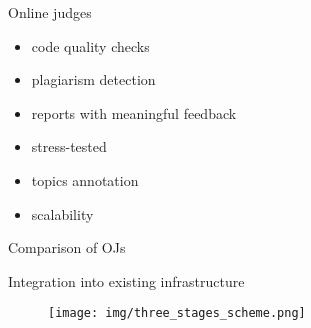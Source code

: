 \documentclass{beamer}%
\begin{document}
\begin{frame}{Online judges}
\begin{changemargin}
\footnotesize




\begin{itemize}
\item<1-> code quality checks
\item<1-> plagiarism detection
\item<1-> reports with meaningful feedback
\item<1-> stress-tested
\item<1-> topics annotation
\item<1-> scalability
\end{itemize}




\end{changemargin}
\end{frame}
\begin{frame}{Comparison of OJs}
\begin{changemargin}
\footnotesize



\end{changemargin}
\end{frame}
\begin{frame}{Integration into existing infrastructure}
\footnotesize


\begin{figure}[h]
\begin{minipage}[h]{0.9\linewidth}
\hbox{\hspace{-0.1em}\texttt{[image: img/three\_stages\_scheme.png]}}
\end{minipage}
\end{figure}



\end{frame}
\end{document}
